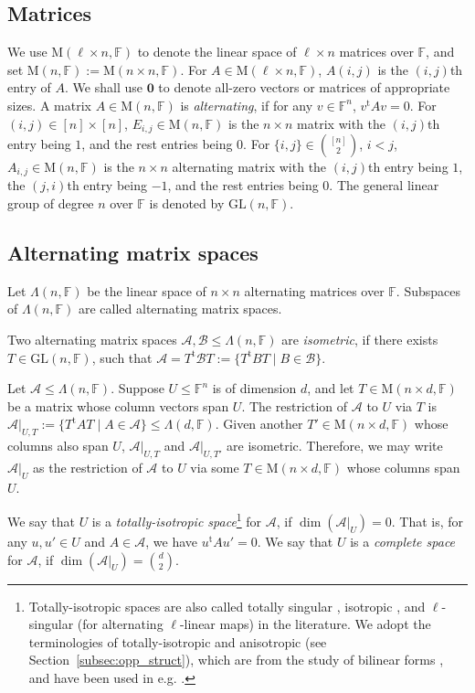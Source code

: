 \documentclass[10pt]{article}
\newcommand{\tuple}[1]{\mathbf{#1}}
\newcommand{\spa}[1]{\mathcal{#1}}
\newcommand{\GL}{\mathrm{GL}}
\newcommand{\F}{\mathbb{F}}
\newcommand{\M}{\mathrm{M}}
\newcommand{\cA}{\spa{A}}
\newcommand{\cB}{\spa{B}}
\newcommand{\vzero}{\tuple{0}}
\newcommand{\tr}[1]{#1^{\mathrm{t}}}
\begin{document}
\subsection{Matrices} 
We use $\M(\ell\times n, \F)$ to denote the linear space 
of $\ell 
\times n$ 
matrices over $\F$, and set $\M(n, \F):=\M(n\times n, \F)$. For $A\in\M(\ell\times 
n, \F)$, $A(i,j)$ is the $(i,j)$th entry of $A$. We shall use $\vzero$ to denote 
all-zero 
vectors or matrices of appropriate sizes.
A matrix $A\in \M(n, 
\F)$ 
is \emph{alternating}, if for any $v\in \F^n$, $\tr{v}Av=0$. 
%
%
For 
$(i, j)\in[n]\times [n]$, $E_{i,j}\in \M(n, 
\F)$ is 
the $n\times n$ matrix with the $(i, j)$th entry being $1$, and the rest entries 
being $0$. For 
$\{i,j\}\in \binom{[n]}{2}$, $i<j$, $A_{i,j}\in 
\M(n, \F)$ is the $n\times n$ alternating matrix with the $(i,j)$th entry being 
$1$, the 
$(j,i)$th entry being $-1$, and the rest entries being $0$. 
The 
general linear group of degree $n$ over $\F$ is denoted by $\GL(n, 
\F)$. 


\subsection{Alternating matrix spaces}\label{subsec:alt_mat_sp}
Let
$\Lambda(n, \F)$ be 
the linear space of $n\times n$ alternating matrices over $\F$. Subspaces of 
$\Lambda(n, \F)$ are called alternating matrix spaces. 

%
%
%

Two alternating matrix spaces $\cA, \cB\leq \Lambda(n, \F)$ are \emph{isometric}, 
if there exists $T\in\GL(n, \F)$, such that 
$\cA=\tr{T}\cB T:=\{\tr{T}BT \mid B\in\cB\}$.

Let $\cA\leq\Lambda(n, \F)$. Suppose $U\leq \F^n$ is of dimension $d$, 
%
%
%
%
%
%
%
%
%
and let $T\in \M(n\times d, \F)$ be a matrix whose column 
vectors span $U$. The restriction of $\cA$ to $U$ via $T$ is $\cA|_{U, 
T}:=\{\tr{T}AT \mid A\in \cA\}\leq \Lambda(d, \F)$. Given another $T'\in\M(n\times 
d,\F)$ whose columns 
also 
span $U$, $\cA|_{U, T}$ and $\cA|_{U, T'}$ are isometric. Therefore, we may write 
$\cA|_U$ as the restriction of $\cA$ to $U$ via some $T\in\M(n\times d, \F)$ whose 
columns span $U$.

We say that $U$ is a \emph{totally-isotropic space}\footnote{Totally-isotropic 
spaces are also called totally singular \cite{Atk73}, isotropic \cite{BGH87}, 
and $\ell$-singular 
\cite{DS10} (for alternating $\ell$-linear maps) in the literature. We 
adopt the terminologies of totally-isotropic and 
anisotropic (see 
Section~\ref{subsec:opp_struct}), which are from the study of bilinear forms 
\cite{MH73}, and have been used in e.g. \cite{BMW17}. } for $\cA$, if 
$\dim(\cA|_U)=0$. That is, for any $u, u'\in U$ and $A\in \cA$, we have 
$\tr{u}Au'=0$. 
We say that $U$ is a \emph{complete space} for $\cA$, if 
$\dim(\cA|_U)=\binom{d}{2}$. 
\end{document}
